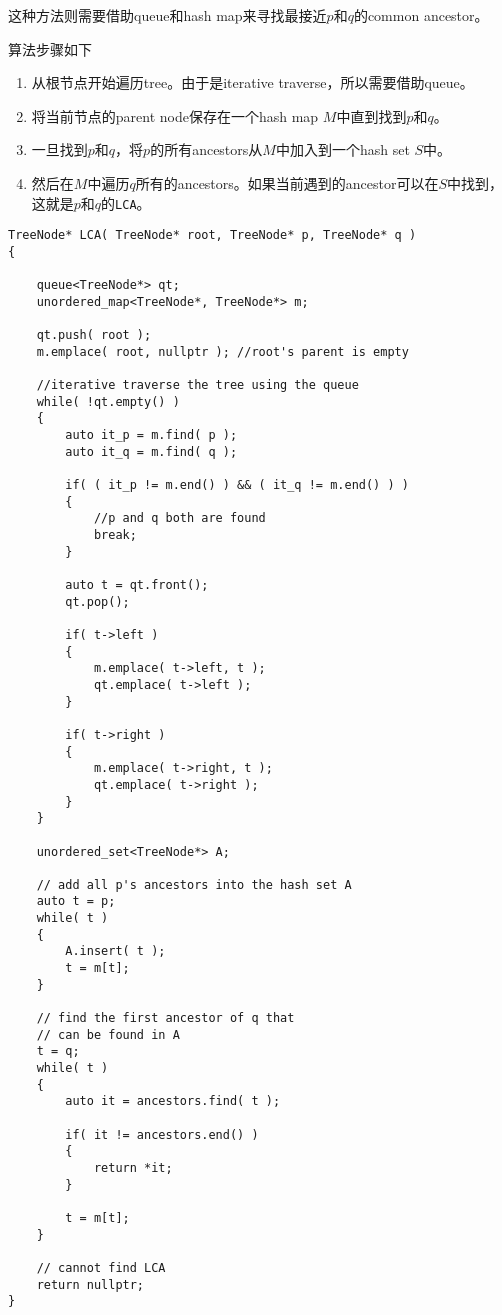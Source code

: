 这种方法则需要借助queue和hash map来寻找最接近$p$和$q$的common ancestor。
\par
算法步骤如下
\begin{enumerate}
\item 从根节点开始遍历tree。由于是iterative traverse，所以需要借助queue。
\item 将当前节点的parent node保存在一个hash map $M$中直到找到$p$和$q$。
\item 一旦找到$p$和$q$，将$p$的所有ancestors从$M$中加入到一个hash set $S$中。
\item 然后在$M$中遍历$q$所有的ancestors。如果当前遇到的ancestor可以在$S$中找到，这就是$p$和$q$的\texttt{LCA}。
\end{enumerate}

\begin{lstlisting}[style=customc, caption={Iterative Searching}]
TreeNode* LCA( TreeNode* root, TreeNode* p, TreeNode* q )
{

    queue<TreeNode*> qt;
    unordered_map<TreeNode*, TreeNode*> m;

    qt.push( root );
    m.emplace( root, nullptr ); //root's parent is empty

    //iterative traverse the tree using the queue
    while( !qt.empty() )
    {
        auto it_p = m.find( p );
        auto it_q = m.find( q );

        if( ( it_p != m.end() ) && ( it_q != m.end() ) )
        {
            //p and q both are found
            break;
        }

        auto t = qt.front();
        qt.pop();

        if( t->left )
        {
            m.emplace( t->left, t );
            qt.emplace( t->left );
        }

        if( t->right )
        {
            m.emplace( t->right, t );
            qt.emplace( t->right );
        }
    }

    unordered_set<TreeNode*> A;

    // add all p's ancestors into the hash set A
    auto t = p;
    while( t )
    {
        A.insert( t );
        t = m[t];
    }

    // find the first ancestor of q that
    // can be found in A
    t = q;
    while( t )
    {
        auto it = ancestors.find( t );

        if( it != ancestors.end() )
        {
            return *it;
        }

        t = m[t];
    }

    // cannot find LCA
    return nullptr;
}
\end{lstlisting}
